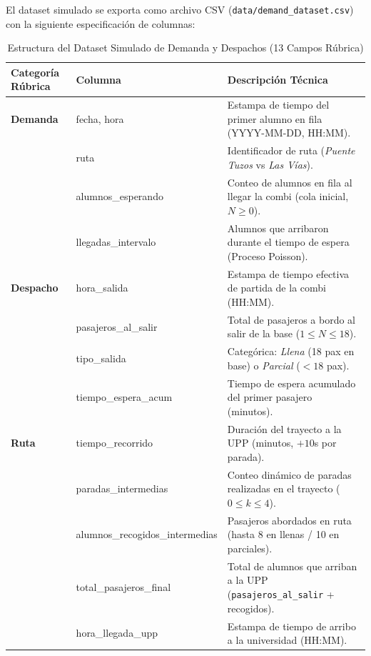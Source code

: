 El dataset simulado se exporta como archivo CSV (\texttt{data/demand\_dataset.csv}) con la siguiente especificación de columnas:

\begin{table}[H]
	\centering
	\caption{Estructura del Dataset Simulado de Demanda y Despachos (13 Campos Rúbrica)}
	\label{tab:dataset_schema}
	\begin{tabularx}{\textwidth}{>{\bfseries\color{purpleUPP}}l >{\small\ttfamily}p{4.2cm} X}
		\toprule
		\rowcolor{purpleUPP!10!white}
		\textbf{Categoría Rúbrica} & \textbf{Columna} & \textbf{Descripción Técnica} \\
		\midrule
		Demanda & fecha, hora & Estampa de tiempo del primer alumno en fila (YYYY-MM-DD, HH:MM). \\
		& ruta & Identificador de ruta (\textit{Puente Tuzos} vs \textit{Las Vías}). \\
		& alumnos\_esperando & Conteo de alumnos en fila al llegar la combi (cola inicial, $N \ge 0$). \\
		& llegadas\_intervalo & Alumnos que arribaron durante el tiempo de espera (Proceso Poisson). \\
		\addlinespace[0.4em]
		Despacho & hora\_salida & Estampa de tiempo efectiva de partida de la combi (HH:MM). \\
		& pasajeros\_al\_salir & Total de pasajeros a bordo al salir de la base ($1 \le N \le 18$). \\
		& tipo\_salida & Categórica: \textit{Llena} (18 pax en base) o \textit{Parcial} ($<18$ pax). \\
		& tiempo\_espera\_acum & Tiempo de espera acumulado del primer pasajero (minutos). \\
		\addlinespace[0.4em]
		Ruta & tiempo\_recorrido & Duración del trayecto a la UPP (minutos, $+10$s por parada). \\
		& paradas\_intermedias & Conteo dinámico de paradas realizadas en el trayecto ($0 \le k \le 4$). \\
		& alumnos\_recogidos\_\newline intermedias & Pasajeros abordados en ruta (hasta 8 en llenas / 10 en parciales). \\
		& total\_pasajeros\_\newline final & Total de alumnos que arriban a la UPP (\texttt{pasajeros\_al\_salir} + recogidos). \\
		& hora\_llegada\_upp & Estampa de tiempo de arribo a la universidad (HH:MM). \\
		\bottomrule
	\end{tabularx}
\end{table}

